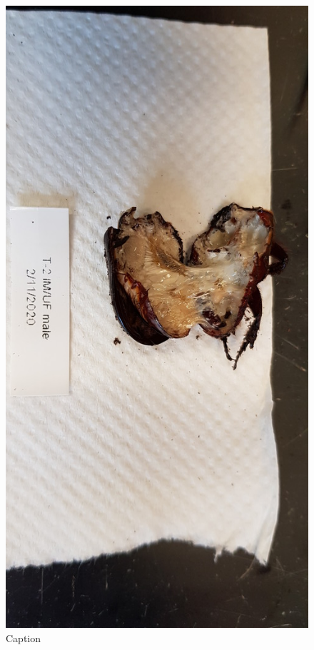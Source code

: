 \begin{figure}[]
\centering
\includegraphics[width=\textwidth]{pm-images/20200211_114845_001.jpg}
\caption{Caption}
\end{figure}

